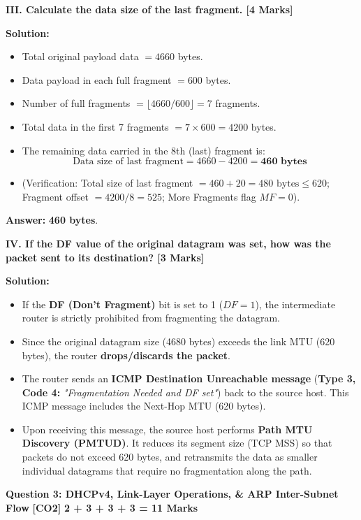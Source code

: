 \documentclass[11pt,a4paper]{article}
\newcommand{\questionheader}[3]{
    \vspace{0.35cm}
    \noindent\colorbox{qboxbg}{
        \parbox{\dimexpr\textwidth-2\fboxsep\relax}{
            \textbf{\textcolor{primary}{\large #1}} \hfill \textbf{\textcolor{accent}{[#2]}} \hfill \textbf{\textcolor{secondary}{#3 Marks}}
        }
    }
    \vspace{0.15cm}
}
\begin{document}
\vspace{0.2cm}
\textbf{III. Calculate the data size of the last fragment. [4 Marks]}

\textbf{Solution:}
\begin{itemize}
    \item Total original payload data $= 4660$ bytes.
    \item Data payload in each full fragment $= 600$ bytes.
    \item Number of full fragments $= \lfloor 4660 / 600 \rfloor = 7$ fragments.
    \item Total data in the first 7 fragments $= 7 \times 600 = 4200$ bytes.
    \item The remaining data carried in the 8th (last) fragment is:
    \[
    \text{Data size of last fragment} = 4660 - 4200 = \mathbf{460\text{ bytes}}
    \]
    \item (Verification: Total size of last fragment $= 460 + 20 = 480\text{ bytes} \le 620$; Fragment offset $= 4200/8 = 525$; More Fragments flag $MF = 0$).
\end{itemize}
\textbf{Answer:} \textbf{460 bytes}.

\vspace{0.2cm}
\textbf{IV. If the DF value of the original datagram was set, how was the packet sent to its destination? [3 Marks]}

\textbf{Solution:}
\begin{itemize}
    \item If the \textbf{DF (Don't Fragment)} bit is set to 1 ($DF = 1$), the intermediate router is strictly prohibited from fragmenting the datagram.
    \item Since the original datagram size (4680 bytes) exceeds the link MTU (620 bytes), the router \textbf{drops/discards the packet}.
    \item The router sends an \textbf{ICMP Destination Unreachable message} (\textbf{Type 3, Code 4:} \emph{"Fragmentation Needed and DF set"}) back to the source host. This ICMP message includes the Next-Hop MTU (620 bytes).
    \item Upon receiving this message, the source host performs \textbf{Path MTU Discovery (PMTUD)}. It reduces its segment size (TCP MSS) so that packets do not exceed 620 bytes, and retransmits the data as smaller individual datagrams that require no fragmentation along the path.
\end{itemize}

\newpage
\questionheader{Question 3: DHCPv4, Link-Layer Operations, \& ARP Inter-Subnet Flow}{CO2}{2 + 3 + 3 + 3 = 11}
\end{document}
